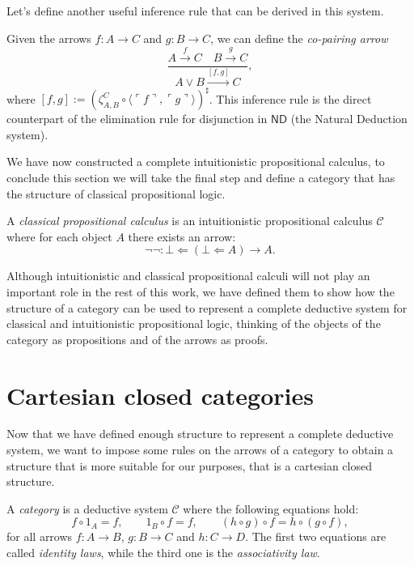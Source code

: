 Let's define another useful inference rule that can be derived in this system.

\begin{example}
    Given the arrows $f : A \to C$ and $g : B \to C$, we can define the \textit{co-pairing arrow}
    \[ \frac{A \xrightarrow{f} C \quad B \xrightarrow{g} C}{A \lor B \xrightarrow{[f,g]} C}, \]
    where $[f,g] := (\zeta_{A,B}^C \circ \langle \ulcorner f \urcorner, \ulcorner g \urcorner\rangle)^\sharp$.
    This inference rule is the direct counterpart of the elimination rule for disjunction in $\mathsf{ND}$ (the Natural Deduction system). 
\end{example}

We have now constructed a complete intuitionistic propositional calculus, to conclude this section we will take the final step and define a category that has the structure of classical propositional logic.

\begin{definition}
    A \textit{classical propositional calculus} is an intuitionistic propositional calculus $\mathcal C$ where for each object $A$ there exists an arrow:
    \[ \neg\neg : \bot \Leftarrow (\bot \Leftarrow A) \to A. \]
\end{definition}

Although intuitionistic and classical propositional calculi will not play an important role in the rest of this work, we have defined them to show how the structure of a category
can be used to represent a complete deductive system for classical and intuitionistic propositional logic, thinking of the objects of the category as propositions and of the arrows as proofs.

\section{Cartesian closed categories}
Now that we have defined enough structure to represent a complete deductive system, we want to impose some rules on the arrows of a category to obtain a structure that is more suitable for our purposes, that is a cartesian closed structure.

\begin{definition}[Category]
    A \textit{category} is a deductive system $\mathcal C$ where the following equations hold:
    \[ f \circ 1_A = f, \qquad 1_B \circ f = f, \qquad (h \circ g) \circ f = h \circ (g \circ f),\]
    for all arrows $f : A \to B$, $g : B \to C$ and $h : C \to D$. The first two equations are called \textit{identity laws}, while the third one is the \textit{associativity law}.
\end{definition}

